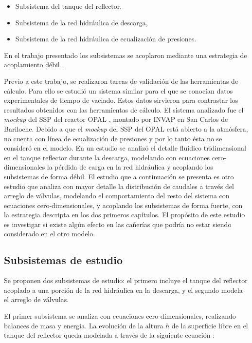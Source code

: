 \begin{itemize}
\item Subsistema del tanque del reflector,
\item Subsistema de la red hidráulica de descarga,
\item Subsistema de la red hidráulica de ecualización de presiones.
\end{itemize}

En el trabajo presentado los subsistemas se acoplaron mediante una estrategia de acoplamiento débil \cite{ra10-paper} \cite{ra10-enief}.

Previo a este trabajo, se realizaron tareas de validación de las herramientas de cálculo.
Para ello se estudió un sistema similar para el que se conocían datos experimentales de tiempo de vaciado.
Estos datos sirvieron para contrastar los resultados obtenidos con las herramientas de cálculo.
El sistema analizado fue el \textit{mockup} del SSP del reactor OPAL \cite{invap-mockup},
montado por INVAP en San Carlos de Bariloche.
Debido a que el \textit{mockup} del SSP del OPAL está abierto a la atmósfera,
no cuenta con línea de ecualización de presiones y por lo tanto ésta no se consideró en el modelo.
En un estudio \cite{cnea-informe-mockup} se analizó el detalle fluídico tridimensional en el tanque reflector durante la descarga,
modelando con ecuaciones cero-dimensionales la pérdida de carga en la red hidráulica 
y acoplando los subsistemas de forma débil.
El estudio que a continuación se presenta es otro estudio que analiza con mayor detalle la distribución de caudales a través del arreglo de válvulas,
modelando el comportamiento del resto del sistema con ecuaciones cero-dimensionales,
y acoplando los subsistemas de forma fuerte, con la estrategia descripta en los dos primeros capítulos.
El propósito de este estudio es investigar si existe algún efecto en las cañerías que podría no estar siendo considerado en el otro modelo.

\subsection*{Subsistemas de estudio}

Se proponen dos subsistemas de estudio:
el primero incluye el tanque del reflector acoplado a una porción de la red hidráulica en la descarga,
y el segundo modela el arreglo de válvulas.

El primer subsistema se analiza con ecuaciones cero-dimensionales,
realizando balances de masa y energía.
La evolución de la altura $h$ de la superficie libre en el tanque del reflector
queda modelada a través de la siguiente ecuación \cite{bird}:

